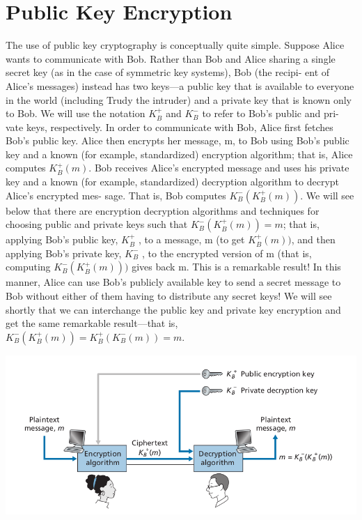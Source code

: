 \documentclass{report}
\begin{document}
{{{\section{Public Key Encryption}
\Large{The use of public key cryptography is conceptually quite simple. Suppose Alice
wants to communicate with Bob. Rather than Bob and Alice
sharing a single secret key (as in the case of symmetric key systems), Bob (the recipi-
ent of Alice’s messages) instead has two keys—a public key that is available to
everyone in the world (including Trudy the intruder) and a private key that is known
only to Bob. We will use the notation $K_B^+$ and $K_B^-$ to refer to Bob’s public and pri-
vate keys, respectively. In order to communicate with Bob, Alice first fetches Bob’s
public key. Alice then encrypts her message, m, to Bob using Bob’s public key and
a known (for example, standardized) encryption algorithm; that is, Alice computes
$K_B^+ (m)$. Bob receives Alice’s encrypted message and uses his private key and a known
(for example, standardized) decryption algorithm to decrypt Alice’s encrypted mes-
sage. That is, Bob computes $K_B^- (K_B^+ (m))$. We will see below that there are encryption
decryption algorithms and techniques for choosing public and private keys such that
$K_B^- (K_B^+ (m)) = m$; that is, applying Bob’s public key, $K_B^+$ , to a message, m (to get
$K_B^+ (m))$, and then applying Bob’s private key, $K_B^-$ , to the encrypted version of m (that
is, computing $K_B^- (K_B^+ (m)))$ gives back m. This is a remarkable result! In this manner,
Alice can use Bob’s publicly available key to send a secret message to Bob without
either of them having to distribute any secret keys! We will see shortly that we can
interchange the public key and private key encryption and get the same remarkable
result––that is, $K_B^- (K_B^+ (m)) = K_B^+ (K_B^- (m)) = m$.
}
\newline
\newline

\includegraphics[scale=0.5]{"keygen.png"}

}}}
\end{document}
